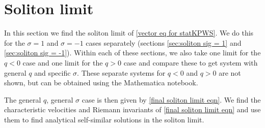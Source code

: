 \documentclass[12pt]{article}
\numberwithin{equation}{section}
\begin{document}
\section{Soliton limit} \label{sec: soliton limit}

In this section we find the soliton limit of \eqref{vector eq for statKPWS}. We do this for the $\sigma = 1$ and $\sigma = -1$ cases separately (sections \ref{sec:soliton sig = 1} and \ref{sec:soliton sig = -1}). Within each of these sections, we also take one limit for the $q<0$ case and one limit for the $q>0$ case and compare these to get system with general $q$ and specific $\sigma$. These separate systems for $q<0$ and $q >0$ are not shown, but can be obtained using the Mathematica notebook. 

The general $q$, general $\sigma$ case is then given by \eqref{final soliton limit eqn}. We find the characteristic velocities and Riemann invariants of \eqref{final soliton limit eqn} and use them to find analytical self-similar solutions in the soliton limit.
\end{document}
